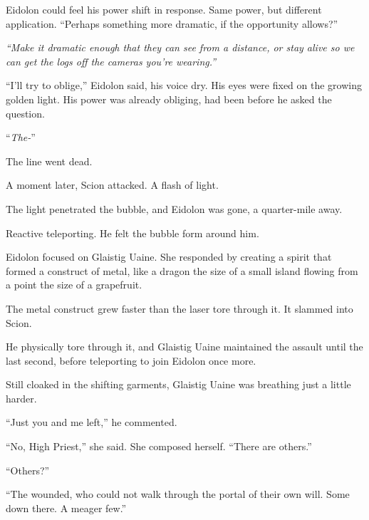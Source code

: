 Eidolon could feel his power shift in response.  Same power, but different application.  ``Perhaps something more dramatic, if the opportunity allows?''



\emph{``Make it dramatic enough that they can see from a distance, or stay alive so we can get the logs off the cameras you're wearing.''}



``I'll try to oblige,'' Eidolon said, his voice dry.  His eyes were fixed on the growing golden light.  His power was already obliging, had been before he asked the question.



``\emph{The-}''



The line went dead.



A moment later, Scion attacked.  A flash of light.



The light penetrated the bubble, and Eidolon was gone, a quarter-mile away.



Reactive teleporting.  He felt the bubble form around him.



Eidolon focused on Glaistig Uaine.  She responded by creating a spirit that formed a construct of metal, like a dragon the size of a small island flowing from a point the size of a grapefruit.



The metal construct grew faster than the laser tore through it.  It slammed into Scion.



He physically tore through it, and Glaistig Uaine maintained the assault until the last second, before teleporting to join Eidolon once more.



Still cloaked in the shifting garments, Glaistig Uaine was breathing just a little harder.



``Just you and me left,'' he commented.



``No, High Priest,'' she said.  She composed herself.  ``There are others.''



``Others?''



``The wounded, who could not walk through the portal of their own will.  Some down there.  A meager few.''



